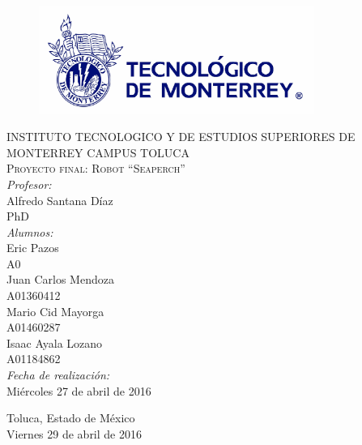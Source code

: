 \begin{titlepage}
\begin{center}
\begin{figure}[!htbp]
\centering
\includegraphics[width=90mm]{./img/logo_itesm.jpg}
\end{figure}


\textsc{ INSTITUTO TECNOLOGICO Y DE ESTUDIOS SUPERIORES DE MONTERREY
CAMPUS TOLUCA}\\[1.5cm]

\textsc{ Proyecto final: Robot ``Seaperch''}\\[0.5cm]


\emph{Profesor:}\\
 Alfredo Santana D\'iaz\\
 PhD\\
 \medskip
\emph{Alumnos:} \\
Eric Pazos \\A0\\
Juan Carlos Mendoza\\A01360412\\
Mario Cid Mayorga\\A01460287\\
Isaac Ayala Lozano\\A01184862\\
 \medskip
\emph{Fecha de realizaci\'on:}\\
Mi\'ercoles 27 de abril de 2016\\
\vfill


{\large
Toluca, Estado de M\'exico\\
Viernes 29 de abril de 2016
}

\end{center}
\end{titlepage}
